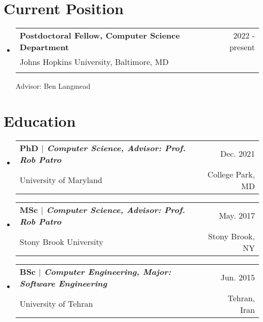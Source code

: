\documentclass[A4,11pt]{article}
\makeatletter
\newcommand{\CVSubheading}[4]{
  \vspace{-2pt}\item
    \begin{tabular*}{0.97\textwidth}[t]{l@{\extracolsep{\fill}}r}
      \textbf{#1} & #2 \\
      \small#3 & \small #4 \\
    \end{tabular*}\vspace{-7pt}
}
\newcommand{\CVSubHeadingListStart}{\begin{itemize}[leftmargin=0.5cm, label={}]}
\newcommand{\CVSubHeadingListEnd}{\end{itemize}}
\makeatother
\begin{document}
\begin{comment}
This CV was written for specifically for positions I was applying for in
academia, and then modified to be a template.

A standard CV is about two pages long where as a resume in the US is one page.
sections can be added and removed here with this in mind. In my experience, 
education, and applicable work experience and skills are the most import things
to include on a resume. For a CV the Europass CV suggests the categories: Work
Experience, Education and Training, Language Skills, Digital Skills,
Communication and Interpersonal Skills, Conferences and Seminars, Creative Works
Driver's License, Hobbies and Interests, Honors and Awards, Management and
Leadership Skills, Networks and Memberships, Organizational Skills, Projects,
Publications, Recommendations, Social and Political Activities, Volunteering.

Your goal is to convey a who, what , when, where, why for every item you share. 
The who is obviously you, but I believe the rest should be done in that order.
For example below. An employer cares most about the degree held and typically 
less about the institution or where it is located (This is still good 
information though). Whatever order you choose be consistent throughout.
\end{comment}

\section{Current Position}
  \CVSubHeadingListStart
    \CVSubheading{Postdoctoral Fellow, Computer Science Department}{2022 - present}
      {Johns Hopkins University, Baltimore, MD}\\
      {Advisor: Ben Langmead}{ }
  \CVSubHeadingListEnd


\section{Education}
  \CVSubHeadingListStart
    \CVSubheading
      {{PhD $|$ \emph{\small{Computer Science, Advisor: Prof. Rob Patro}}}}{Dec. 2021}
      {University of Maryland}{College Park, MD}
    \CVSubheading
      {{MSc $|$ \emph{\small{Computer Science, Advisor: Prof. Rob Patro}}}}{May. 2017}
      {Stony Brook University}{Stony Brook, NY}
    \CVSubheading
      {{BSc $|$ \emph{\small{Computer Engineering, Major: Software Engineering}}}}{Jun. 2015}
      {University of Tehran}{Tehran, Iran}
  \CVSubHeadingListEnd
\begin{comment}
try to briefly explain what you did and why it is relevant to the position you
are seeking
\end{comment}
\end{document}
